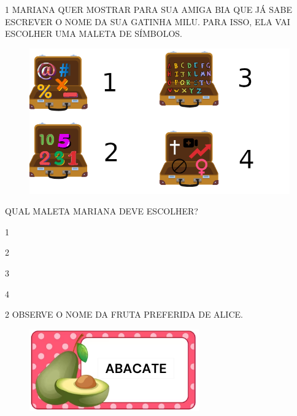 \pagebreak



\pagebreak

\num{1} MARIANA QUER MOSTRAR PARA SUA AMIGA BIA QUE JÁ SABE ESCREVER O NOME DA SUA GATINHA MILU. PARA ISSO, ELA VAI ESCOLHER UMA MALETA DE SÍMBOLOS. 

\begin{figure}[htpb!]
\includegraphics[width=\textwidth]{media/image209.png}
\end{figure}

QUAL MALETA MARIANA DEVE ESCOLHER?

\begin{escolha}
\item 1

\item 2

\item 3

\item 4
\end{escolha}

\num{2} OBSERVE O NOME DA FRUTA PREFERIDA DE ALICE.

\begin{figure}[htpb!]
\centering
\includegraphics[width=.45\textwidth]{media/image212.png}
\end{figure}

